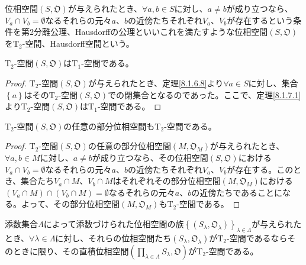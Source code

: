 \documentclass[dvipdfmx]{jsarticle}
\begin{document}
\begin{dfn}
位相空間$\left( S,\mathfrak{O} \right)$が与えられたとき、$\forall a,b \in S$に対し、$a \neq b$が成り立つなら、$V_{a} \cap V_{b} = \emptyset$なるそれらの元々$a$、$b$の近傍たちそれぞれ$V_{a}$、$V_{b}$が存在するという条件を第2分離公理、Hausdorffの公理といいこれを満たすような位相空間$\left( S,\mathfrak{O} \right)$を$\mathrm{T}_{2}$-空間、Hausdorff空間という。
\end{dfn}
\begin{thm}\label{8.1.7.6}
$\mathrm{T}_{2}$-空間$\left( S,\mathfrak{O} \right)$は$\mathrm{T}_{1}$-空間である。
\end{thm}
\begin{proof}
$\mathrm{T}_{2}$-空間$\left( S,\mathfrak{O} \right)$が与えられたとき、定理\ref{8.1.6.8}より$\forall a \in S$に対し、集合$\left\{ a \right\}$はその$\mathrm{T}_{2}$-空間$\left( S,\mathfrak{O} \right)$での閉集合となるのであった。ここで、定理\ref{8.1.7.1}より$\mathrm{T}_{2}$-空間$\left( S,\mathfrak{O} \right)$は$\mathrm{T}_{1}$-空間である。
\end{proof}
\begin{thm}\label{8.1.7.7}
$\mathrm{T}_{2}$-空間$\left( S,\mathfrak{O} \right)$の任意の部分位相空間も$\mathrm{T}_{2}$-空間である。
\end{thm}
\begin{proof}
$\mathrm{T}_{2}$-空間$\left( S,\mathfrak{O} \right)$の任意の部分位相空間$\left( M,\mathfrak{O}_{M} \right)$が与えられたとき、$\forall a,b \in M$に対し、$a \neq b$が成り立つなら、その位相空間$\left( S,\mathfrak{O} \right)$における$V_{a} \cap V_{b} = \emptyset$なるそれらの元々$a$、$b$の近傍たちそれぞれ$V_{a}$、$V_{b}$が存在する。このとき、集合たち$V_{a} \cap M$、$V_{b} \cap M$はそれぞれその部分位相空間$\left( M,\mathfrak{O}_{M} \right)$における$\left( V_{a} \cap M \right) \cap \left( V_{b} \cap M \right) = \emptyset$なるそれらの元々$a$、$b$の近傍たちであることになる。よって、その部分位相空間$\left( M,\mathfrak{O}_{M} \right)$も$\mathrm{T}_{2}$-空間である。
\end{proof}
\begin{thm}\label{8.1.7.8}
添数集合$\varLambda$によって添数づけられた位相空間の族$\left\{ \left( S_{\lambda},\mathfrak{O}_{\lambda} \right) \right\}_{\lambda \in \varLambda}$が与えられたとき、$\forall\lambda \in \varLambda$に対し、それらの位相空間たち$\left( S_{\lambda},\mathfrak{O}_{\lambda} \right)$が$\mathrm{T}_{2}$-空間であるならそのときに限り、その直積位相空間$\left( \prod_{\lambda \in \varLambda} S_{\lambda},\mathfrak{O} \right)$が$\mathrm{T}_{2}$-空間である。
\end{thm}
\end{document}
